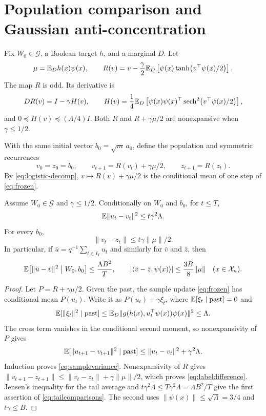 \documentclass[11pt,letterpaper,pmlr,twoside]{jmlr}
\newcommand{\X}{\mathcal X}\newcommand{\Hc}{\mathcal H}
\newcommand{\ip}[2]{\langle #1,#2\rangle}\newcommand{\norm}[1]{\lVert #1\rVert}
\newcommand{\Gcal}{\mathcal G}\newcommand{\Bfr}{\mathfrak B}
\begin{document}
\section{Population comparison and Gaussian anti-concentration}
\label{app:null}
Fix $W_0\in\Gcal$, a Boolean target $h$, and a marginal $D$. Let
\[
 \mu=\mathbb E_D h(x)\psi(x),\qquad
 R(v)=v-\frac\gamma2\mathbb E_D\left[\psi(x)\tanh\bigl(v^\top\psi(x)/2\bigr)\right].
\]
The map $R$ is odd. Its derivative is
\begin{equation}
 DR(v)=I-\gamma H(v),\qquad
 H(v)=\frac14\mathbb E_D\left[\psi(x)\psi(x)^\top
             \operatorname{sech}^2\bigl(v^\top\psi(x)/2\bigr)\right],
 \label{eq:H}
\end{equation}
and $0\preceq H(v)\preceq(\Lambda/4)I$. Both $R$ and $R+\gamma\mu/2$ are nonexpansive when $\gamma\le1/2$.

With the same initial vector $b_0=\sqrt m\,a_0$, define the population and symmetric recurrences
\begin{equation}
 v_0=z_0=b_0,
 \qquad v_{t+1}=R(v_t)+\gamma\mu/2,
 \qquad z_{t+1}=R(z_t).
 \label{eq:population}
\end{equation}
By \eqref{eq:logistic-decomp}, $v\mapsto R(v)+\gamma\mu/2$ is the conditional mean of one step of \eqref{eq:frozen}.

\begin{lemma}
\label{lem:population}
Assume $W_0\in\Gcal$ and $\gamma\le1/2$. Conditionally on $W_0$ and $b_0$, for $t\le T$,
\begin{equation}
 \E\norm{u_t-v_t}^2\le t\gamma^2\Lambda.
 \label{eq:samplevariance}
\end{equation}
For every $b_0$,
\begin{equation}
 \norm{v_t-z_t}\le t\gamma\norm\mu/2.
 \label{eq:labeldifference}
\end{equation}
In particular, if $\bar u=q^{-1}\sum_{t\in I_T}u_t$ and similarly for $\bar v$ and $\bar z$, then
\begin{equation}
 \E\bigl[\norm{\bar u-\bar v}^2\bigm| W_0,b_0\bigr]
 \le\frac{\Lambda B^2}{T},
 \qquad
 |\ip{\bar v-\bar z}{\psi(x)}|\le\frac{3B}{8}\norm\mu\quad(x\in\X_n).
 \label{eq:tailcomparisons}
\end{equation}
\end{lemma}
\begin{proof}
Let $P=R+\gamma\mu/2$. Given the past, the sample update \eqref{eq:frozen} has conditional mean $P(u_t)$. Write it as $P(u_t)+\gamma\xi_t$, where $\mathbb E[\xi_t\mid\text{past}]=0$ and
\[
 \E[\norm{\xi_t}^2\mid\text{past}]
 \le\E_D\norm{g(h(x),u_t^\top\psi(x))\psi(x)}^2\le\Lambda.
\]
The cross term vanishes in the conditional second moment, so nonexpansivity of $P$ gives
\[
 \E[\norm{u_{t+1}-v_{t+1}}^2\mid\text{past}]
 \le\norm{u_t-v_t}^2+\gamma^2\Lambda.
\]
Induction proves \eqref{eq:samplevariance}. Nonexpansivity of $R$ gives
$\norm{v_{t+1}-z_{t+1}}\le\norm{v_t-z_t}+\gamma\norm\mu/2$, which proves \eqref{eq:labeldifference}. Jensen's inequality for the tail average and $t\gamma^2\Lambda\le T\gamma^2\Lambda=\Lambda B^2/T$ give the first assertion of \eqref{eq:tailcomparisons}. The second uses $\norm{\psi(x)}\le\sqrt\Lambda=3/4$ and $t\gamma\le B$.
\end{proof}
\end{document}
